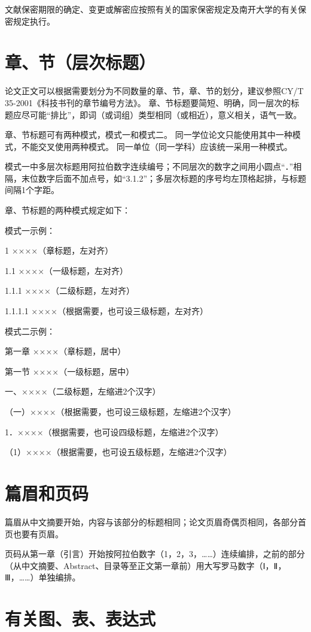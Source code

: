 文献保密期限的确定、变更或解密应按照有关的国家保密规定及南开大学的有关保密规定执行。

\section{章、节（层次标题）}

论文正文可以根据需要划分为不同数量的章、节，章、节的划分，建议参照CY/T 35-2001《科技书刊的章节编号方法》。
章、节标题要简短、明确，同一层次的标题应尽可能“排比”，即词（或词组）类型相同（或相近），意义相关，语气一致。

章、节标题可有两种模式，模式一和模式二。
同一学位论文只能使用其中一种模式，不能交叉使用两种模式。
同一单位（同一学科）应该统一采用一种模式。

模式一中多层次标题用阿拉伯数字连续编号；不同层次的数字之间用小圆点“．”相隔，末位数字后面不加点号，如“3.1.2”；多层次标题的序号均左顶格起排，与标题间隔1个字距。

章、节标题的两种模式规定如下：

模式一示例：

1 ××××（章标题，左对齐）

1.1 ××××（一级标题，左对齐）

1.1.1 ××××（二级标题，左对齐）

1.1.1.1 ××××（根据需要，也可设三级标题，左对齐）

模式二示例：

第一章 ××××（章标题，居中）

第一节 ××××（一级标题，居中）

一、××××（二级标题，左缩进2个汉字）

（一）××××（根据需要，也可设三级标题，左缩进2个汉字）

1．××××（根据需要，也可设四级标题，左缩进2个汉字）

（1）××××（根据需要，也可设五级标题，左缩进2个汉字）

\section{篇眉和页码}

篇眉从中文摘要开始，内容与该部分的标题相同；论文页眉奇偶页相同，各部分首页也要有页眉。

页码从第一章（引言）开始按阿拉伯数字（1，2，3，……）连续编排，之前的部分（从中文摘要、Abstract、目录等至正文第一章前）用大写罗马数字（Ⅰ，Ⅱ，Ⅲ，……）单独编排。

\section{有关图、表、表达式}

